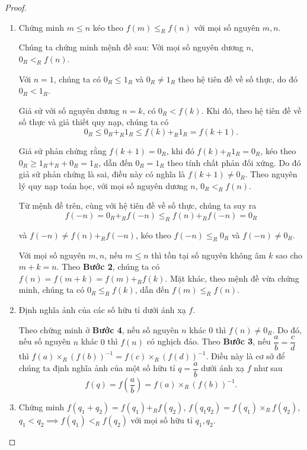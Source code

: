 \begin{proof}
\begin{enumerate}[label={\textbf{Bước \arabic*.}},itemindent=1cm]
        \item Chứng minh $m\leq n$ kéo theo $f(m) \leq_{R} f(n)$ với mọi số nguyên $m, n$.

              Chúng ta chứng minh mệnh đề sau: Với mọi số nguyên dương $n$, $0_{R} <_{R} f(n)$.

              Với $n = 1$, chúng ta có $0_{R}\leq 1_{R}$ và $0_{R}\ne 1_{R}$ theo hệ tiên đề về số thực, do đó $0_{R} < 1_{R}$.

              Giả sử với số nguyên dương $n = k$, có $0_{R} < f(k)$. Khi đó, theo hệ tiên đề về số thực và giả thiết quy nạp, chúng ta có
              \[
                  0_{R}\leq 0_{R} +_{R} 1_{R}\leq f(k) +_{R} 1_{R} = f(k+1).
              \]

              Giả sử phản chứng rằng $f(k + 1) = 0_{R}$, khi đó $f(k) +_{R} 1_{R} = 0_{R}$, kéo theo $0_{R}\geq 1_{R} +_{R} + 0_{R} = 1_{R}$, dẫn đến $0_{R} = 1_{R}$ theo tính chất phản đối xứng. Do đó giả sử phản chứng là sai, điều này có nghĩa là $f(k+1)\ne 0_{R}$. Theo nguyên lý quy nạp toán học, với mọi số nguyên dương $n$, $0_{R} <_{R} f(n)$.

              Từ mệnh đề trên, cùng với hệ tiên đề về số thực, chúng ta suy ra
              \[
                  f(-n) = 0_{R} +_{R} f(-n) \leq_{R} f(n) +_{R} f(-n) = 0_{R}
              \]

              và $f(-n)\ne f(n) +_{R} f(-n)$, kéo theo $f(-n) \leq_{R} 0_{R}$ và $f(-n)\ne 0_{R}$.

              Với mọi số nguyên $m, n$, nếu $m\leq n$ thì tồn tại số nguyên không âm $k$ sao cho $m + k = n$. Theo \textbf{Bước 2}, chúng ta có $f(n) = f(m + k) = f(m) +_{R} f(k)$. Mặt khác, theo mệnh đề vừa chứng minh, chúng ta có $0_{R}\leq_{R} f(k)$, dẫn đến $f(m)\leq_{R} f(n)$.
        \item Định nghĩa ảnh của các số hữu tỉ dưới ánh xạ $f$.

              Theo chứng minh ở \textbf{Bước 4}, nếu số nguyên $n$ khác $0$ thì $f(n)\ne 0_{R}$. Do đó, nếu số nguyên $n$ khác $0$ thì $f(n)$ có nghịch đảo. Theo \textbf{Bước 3}, nếu $\dfrac{a}{b} = \dfrac{c}{d}$ thì $f(a)\times_{R} {(f(b))}^{-1} = f(c)\times_{R} {(f(d))}^{-1}$. Điều này là cơ sở để chúng ta định nghĩa ảnh của một số hữu tỉ $q = \dfrac{a}{b}$ dưới ánh xạ $f$ như sau
              \[
                  f(q) = f\left(\frac{a}{b}\right) = f(a)\times_{R} {(f(b))}^{-1}.
              \]
        \item Chứng minh $f(q_{1} + q_{2}) = f(q_{1}) +_{R} f(q_{2})$, $f(q_{1}q_{2}) = f(q_{1}) \times_{R} f(q_{2})$, $q_{1} < q_{2}\implies f(q_{1}) <_{R} f(q_{2})$ với mọi số hữu tỉ $q_{1}, q_{2}$.


\end{enumerate}
\end{proof}
